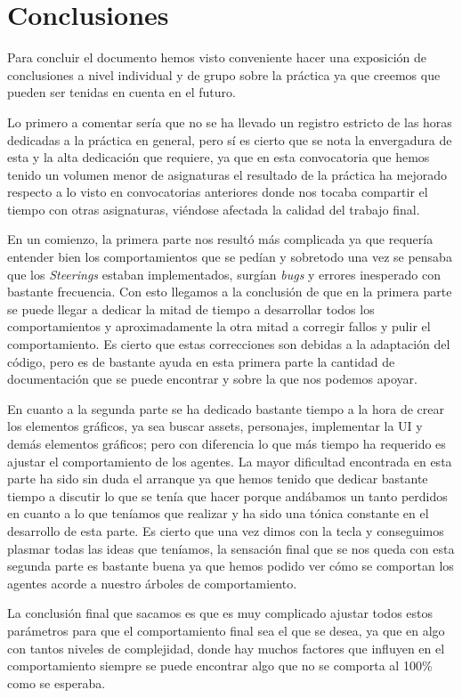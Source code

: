 \section{Conclusiones}

Para concluir el documento hemos visto conveniente hacer una exposición de conclusiones a nivel individual y de grupo sobre la práctica ya que creemos que pueden ser tenidas en cuenta en el futuro.

Lo primero a comentar sería que no se ha llevado un registro estricto de las horas dedicadas a la práctica en general, pero sí es cierto que se nota la envergadura de esta y la alta dedicación que requiere, ya que en esta convocatoria que hemos tenido un volumen menor de asignaturas el resultado de la práctica ha mejorado respecto a lo visto en convocatorias anteriores donde nos tocaba compartir el tiempo con otras asignaturas, viéndose afectada la calidad del trabajo final.

En un comienzo, la primera parte nos resultó más complicada ya que requería entender bien los comportamientos que se pedían y sobretodo una vez se pensaba que los \textit{Steerings} estaban implementados, surgían \textit{bugs} y errores inesperado con bastante frecuencia. Con esto llegamos a la conclusión de que en la primera parte se puede llegar a dedicar la mitad de tiempo a desarrollar todos los comportamientos y aproximadamente la otra mitad a corregir fallos y pulir el comportamiento. Es cierto que estas correcciones son debidas a la adaptación del código, pero es de bastante ayuda en esta primera parte la cantidad de documentación que se puede encontrar y sobre la que nos podemos apoyar.

En cuanto a la segunda parte se ha dedicado bastante tiempo a la hora de crear los elementos gráficos, ya sea buscar assets, personajes, implementar la UI y demás elementos gráficos; pero con diferencia lo que más tiempo ha requerido es ajustar el comportamiento de los agentes. La mayor dificultad encontrada en esta parte ha sido sin duda el arranque ya que hemos tenido que dedicar bastante tiempo a discutir lo que se tenía que hacer porque andábamos un tanto perdidos en cuanto a lo que teníamos que realizar y ha sido una tónica constante en el desarrollo de esta parte. Es cierto que una vez dimos con la tecla y conseguimos plasmar todas las ideas que teníamos, la sensación final que se nos queda con esta segunda parte es bastante buena ya que hemos podido ver cómo se comportan los agentes acorde a nuestro árboles de comportamiento.

La conclusión final que sacamos es que es muy complicado ajustar todos estos parámetros para que el comportamiento final sea el que se desea, ya que en algo con tantos niveles de complejidad, donde hay muchos factores que influyen en el comportamiento siempre se puede encontrar algo que no se comporta al 100\% como se esperaba.